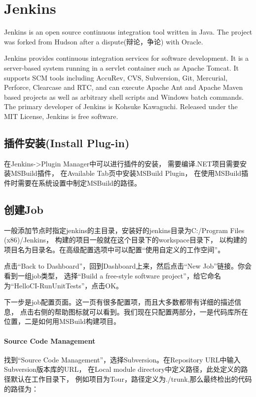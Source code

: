 \documentclass{book}
\begin{document}
\section{Jenkins}

Jenkins is an open source continuous integration tool written in Java. 
The project was forked from Hudson after a dispute(辩论，争论) with Oracle.

Jenkins provides continuous integration services for software development. 
It is a server-based system running in a servlet container such as Apache Tomcat. 
It supports SCM tools including AccuRev, CVS, Subversion, Git, Mercurial, Perforce, 
Clearcase and RTC, and can execute Apache Ant and Apache Maven based projects 
as well as arbitrary shell scripts and Windows batch commands. 
The primary developer of Jenkins is Kohsuke Kawaguchi.
Released under the MIT License, Jenkins is free software.

\subsection{插件安装(Install Plug-in)}

在Jenkins->Plugin Manager中可以进行插件的安装，
需要编译.NET项目需要安装MSBuild插件，
在Available Tab页中安装MSBuild Plugin，
在使用MSBuild插件时需要在系统设置中制定MSBuild的路径。

\subsection{创建Job}

一般添加节点时指定jenkins的主目录，安装好的jenkins目录为C:/Program Files (x86)/Jenkins，
构建的项目一般就在这个目录下的workspace目录下，
以构建的项目名为目录名。在高级配置选项中可以配置“使用自定义的工作空间”。

点击“Back to Dashboard”，回到Dashboard上来，然后点击“New Job”链接。你会看到一组job类型，
选择“Build a free-style software project”，给它命名为“HelloCI-RunUnitTests”，点击OK。

下一步是job配置页面。这一页有很多配置项，而且大多数都带有详细的描述信息，
点击右侧的帮助图标就可以看到。我们现在只配置两部分，一是代码库所在位置，二是如何用MSBuild构建项目。

\paragraph{Source Code Management}

找到“Source Code Management”，选择Subversion。在Repository URL中输入Subversion版本库的URL，
在Local module directory中定义路径，此处定义的路径默认在工作目录下，
例如项目为Tour，路径定义为./trunk,那么最终检出的代码的路径为：
\end{document}
